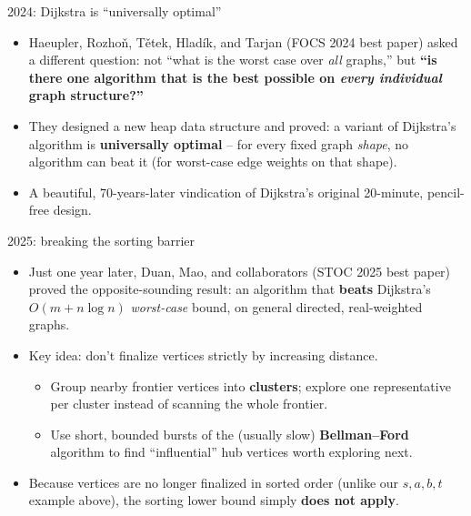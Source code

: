 \documentclass[11pt,aspectratio=169]{beamer}
\begin{document}
\begin{frame}{2024: Dijkstra is ``universally optimal''}
  \begin{itemize}
    \item Haeupler, Rozho\v{n}, T\v{e}tek, Hladík, and Tarjan (\textsc{FOCS} 2024 best
    paper) asked a different question: not ``what is the worst case over \emph{all}
    graphs,'' but \textbf{``is there one algorithm that is the best possible on
    \emph{every individual} graph structure?''}
    \item They designed a new heap data structure and proved: a variant of Dijkstra's
    algorithm is \textbf{universally optimal} -- for every fixed graph \emph{shape},
    no algorithm can beat it (for worst-case edge weights on that shape).
    \item A beautiful, 70-years-later vindication of Dijkstra's original 20-minute,
    pencil-free design.
  \end{itemize}
\end{frame}

\begin{frame}{2025: breaking the sorting barrier}
  \begin{itemize}
    \item Just one year later, Duan, Mao, and collaborators (\textsc{STOC} 2025 best
    paper) proved the opposite-sounding result: an algorithm that
    \textbf{beats} Dijkstra's $O(m + n\log n)$ \emph{worst-case} bound, on general
    directed, real-weighted graphs.
    \item Key idea: don't finalize vertices strictly by increasing distance.
    \begin{itemize}
      \item Group nearby frontier vertices into \textbf{clusters}; explore one
      representative per cluster instead of scanning the whole frontier.
      \item Use short, bounded bursts of the (usually slow) \textbf{Bellman--Ford}
      algorithm to find ``influential'' hub vertices worth exploring next.
    \end{itemize}
    \item Because vertices are no longer finalized in sorted order (unlike our
    $s,a,b,t$ example above), the sorting lower bound simply \textbf{does not apply}.
  \end{itemize}
\end{frame}
\end{document}
